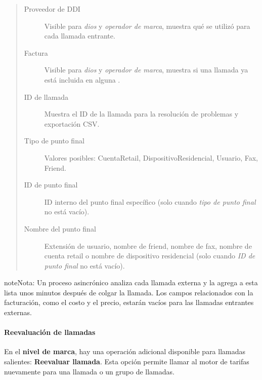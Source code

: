 \documentclass[letterpaper,10pt,spanish]{sphinxmanual}
\begin{document}
\begin{quote}
\begin{description}
\item[{Proveedor de DDI}] \leavevmode
Visible para \emph{dios} y \emph{operador de marca}, muestra qué {\hyperref[administration_portal/brand/providers/ddi_providers:ddi\string-providers]{}} se utilizó para cada llamada entrante.

\item[{Factura}] \leavevmode
Visible para \emph{dios} y \emph{operador de marca}, muestra si una llamada ya está incluida en alguna {\hyperref[administration_portal/brand/invoicing/invoices:invoices]{}}.

\item[{ID de llamada}] \leavevmode
Muestra el ID de la llamada para la resolución de problemas y exportación CSV.

\item[{Tipo de punto final}] \leavevmode
Valores posibles: CuentaRetail, DispositivoResidencial, Usuario, Fax, Friend.

\item[{ID de punto final}] \leavevmode
ID interno del punto final específico (solo cuando \emph{tipo de punto final} no está vacío).

\item[{Nombre del punto final}] \leavevmode
Extensión de usuario, nombre de friend, nombre de fax, nombre de cuenta retail o nombre de dispositivo residencial (solo cuando \emph{ID de punto final} no está vacío).

\end{description}
\end{quote}

\begin{notice}{note}{Nota:}
Un proceso asincrónico analiza cada llamada externa y la agrega a esta lista unos minutos después de colgar la llamada. Los campos relacionados con la facturación, como el costo y el precio, estarán vacíos para las llamadas entrantes externas.
\end{notice}


\paragraph{Reevaluación de llamadas}
\label{administration_portal/client/residential/calls/external_calls:call-rerating}
En el \textbf{nivel de marca}, hay una operación adicional disponible para llamadas salientes: \textbf{Reevaluar llamada}. Esta opción permite llamar al motor de tarifas nuevamente para una llamada o un grupo de llamadas.
\end{document}
